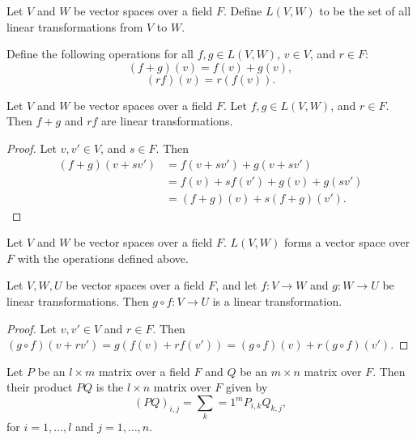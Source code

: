 \documentclass[12pt]{article}
\begin{document}
\begin{defn}
    Let $V$ and $W$ be vector spaces over a field $F$. Define $L(V, W)$ to be the set of all linear transformations from $V$ to $W$.
\end{defn}

\begin{defn}
    Define the following operations for all $f, g \in L(V, W)$, $v \in V$, and $r \in F$:
    \[(f + g)(v) = f(v) + g(v),\]
    \[(rf)(v) = r(f(v)).\]
\end{defn}

\begin{lemma}
    Let $V$ and $W$ be vector spaces over a field $F$. Let $f, g \in L(V, W)$, and $r \in F$. Then $f + g$ and $rf$ are linear transformations.
\end{lemma}

\begin{proof}
    Let $v, v' \in V$, and $s \in F$. Then
    \begin{align*}
        (f + g)(v + sv') &= f(v + sv') + g(v + sv') \\
        &= f(v) + sf(v') + g(v) + g(sv') \\
        &= (f + g)(v) + s(f + g)(v').
    \end{align*}
\end{proof}

\begin{thm}
    Let $V$ and $W$ be vector spaces over a field $F$. $L(V, W)$ forms a vector space over $F$ with the operations defined above.
\end{thm}

\begin{thm}
    Let $V, W, U$ be vector spaces over a field $F$, and let $f: V \to W$ and $g: W \to U$ be linear transformations. Then $g \circ f: V \to U$ is a linear transformation.
\end{thm}

\begin{proof}
    Let $v, v' \in V$ and $r \in F$. Then $(g \circ f)(v + rv') = g(f(v) + rf(v')) = (g \circ f)(v) + r(g \circ f)(v')$.
\end{proof}

\begin{defn}
    Let $P$ be an $l \times m$ matrix over a field $F$ and $Q$ be an $m \times n$ matrix over $F$. Then their product $PQ$ is the $l \times n$ matrix over $F$ given by
    \[(PQ)_{i,j} = \sum_k=1^m P_{i, k}Q_{k, j},\] for $i = 1, \ldots, l$ and $j = 1, \ldots, n$.
\end{defn}
\end{document}
